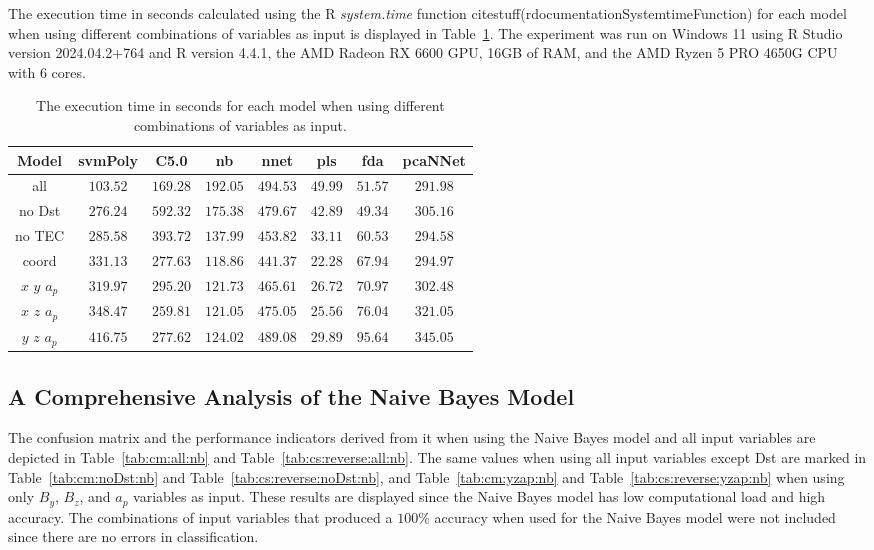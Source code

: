 \documentclass[preprint,12pt]{elsarticle}
\begin{document}
The execution time in seconds calculated using the R \textit{system.time} function citestuff(rdocumentationSystemtimeFunction) for each model when using different combinations of variables as input is displayed in Table~\ref{tab:time:total}. The experiment was run on Windows 11 using R Studio version 2024.04.2+764 and R version 4.4.1, the AMD Radeon RX 6600 GPU, 16GB of RAM, and the AMD Ryzen 5 PRO 4650G CPU with 6 cores.

\begin{table}[!ht]
	\centering
	\begin{tabular}{|c|c|c|c|c|c|c|c|}
		\hline
		Model & svmPoly & C5.0 & nb & nnet & pls & fda & pcaNNet \\ \hline
		all & $103.52$ & $169.28$ & $192.05$ & $494.53$ & $49.99$ & $51.57$ & $291.98$ \\ \hline
		no Dst & $276.24$ & $592.32$ & $175.38$ & $479.67$ & $42.89$ & $49.34$ & $305.16$ \\ \hline
		no TEC & $285.58$ & $393.72$ & $137.99$ & $453.82$ & $33.11$ & $60.53$ & $294.58$ \\ \hline
		coord & $331.13$ & $277.63$ & $118.86$ & $441.37$ & $22.28$ & $67.94$ & $294.97$ \\ \hline
		$x$ $y$ $a_{p}$ & $319.97$ & $295.20$ & $121.73$ & $465.61$ & $26.72$ & $70.97$ & $302.48$ \\ \hline
		$x$ $z$ $a_{p}$ & $348.47$ & $259.81$ & $121.05$ & $475.05$ & $25.56$ & $76.04$ & $321.05$ \\ \hline
		$y$ $z$ $a_{p}$ & $416.75$ & $277.62$ & $124.02$ & $489.08$ & $29.89$ & $95.64$ & $345.05$ \\ \hline
	\end{tabular}
	\caption{The execution time in seconds for each model when using different combinations of variables as input.}
	\label{tab:time:total}
\end{table}

\subsection{A Comprehensive Analysis of the Naive Bayes Model}

The confusion matrix and the performance indicators derived from it when using the Naive Bayes model and all input variables are depicted in Table~\ref{tab:cm:all:nb} and Table~\ref{tab:cs:reverse:all:nb}. The same values when using all input variables except Dst are marked in Table~\ref{tab:cm:noDst:nb} and Table~\ref{tab:cs:reverse:noDst:nb}, and Table~\ref{tab:cm:yzap:nb} and Table~\ref{tab:cs:reverse:yzap:nb} when using only $B_{y}$, $B_{z}$, and $a_{p}$ variables as input. These results are displayed since the Naive Bayes model has low computational load and high accuracy. The combinations of input variables that produced a $100\%$ accuracy when used for the Naive Bayes model were not included since there are no errors in classification.
\end{document}
